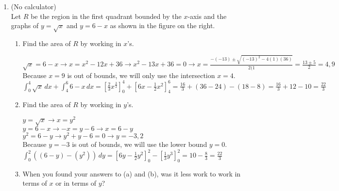 \documentclass[10pt,letterpaper]{report}
\begin{document}
\begin{enumerate}
    \pagebreak
    
  \item{(No calculator) \\
        Let $R$ be the region in the first quadrant bounded by the $x$-axis and the graphs of $y=\sqrt{x}$ and $y=6-x$ as shown in the figure on the right. }
    \begin{enumerate}
      \item{Find the area of $R$ by working in $x$'s. \\}
      
        $\sqrt{x}=6-x\rightarrow x=x^{2}-12x+36\rightarrow x^{2}-13x+36=0\rightarrow x=\frac{-(-13)\pm\sqrt{(-13)^{2}-4(1)(36)}}{2(1}=\frac{13\pm 5}{2}=4, 9$ \\
        
        Because $x=9$ is out of bounds, we will only use the intersection $x=4$. \\
        
        $\int_{0}^{4}{\sqrt{x}}\,dx+\int_{4}^{6}{6-x}\,dx=
        [\frac{2}{3}x^{\frac{3}{2}}]_{0}^{4}+[6x-\frac{1}{2}x^{2}]_{4}^{6}=
        \frac{16}{3}+(36-24)-(18-8)=
        \frac{16}{3}+12-10=\frac{22}{3}$ \\
        
      \item{Find the area of $R$ by working in $y$'s. \\}
      
        $y=\sqrt{x}\rightarrow x=y^2$ \\
        
        $y=6-x\rightarrow -x=y-6\rightarrow x=6-y$ \\
        
        $y^{2}=6-y\rightarrow y^{2}+y-6=0\rightarrow y=-3, 2$ \\
        
        Because $y=-3$ is out of bounds, we will use the lower bound $y=0$. \\
        
        $\int_{0}^{2}{\left(\left(6-y\right)-\left(y^{2}\right)\right)}\,dy=
        [6y-\frac{1}{2}y^{2}]_{0}^{2}-[\frac{1}{3}y^{3}]_{0}^{2}=
        10-\frac{8}{3}=\frac{22}{3}$ \\
        
      \item{When you found your answers to (a) and (b), was it less work to work in terms of $x$ or in terms of $y$? \\}
      

\end{enumerate}
\end{enumerate}
\end{document}
